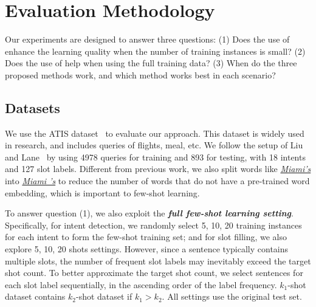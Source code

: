 \section{Evaluation Methodology}
Our experiments are designed to answer three questions: (1) Does the use of \REs enhance the learning quality when the number of training
instances is small? (2) Does the use of \REs help when using the full training data?
(3) When do the three proposed methods work, and which method works best in each scenario?

\subsection{Datasets}
\label{sec_datasest}

We use the ATIS dataset~\cite{hemphill1990atis} to evaluate our approach. This dataset is widely used in \SLU research, and
includes queries of flights, meal, etc. We follow the setup of Liu and Lane~ by using 4978 queries for training and 893 for
testing, with 18 intents and 127 slot labels.
Different from previous work, we also split words like
\textsl{\underline{Miami's}} into \textsl{\underline{Miami 's}} to reduce the number of words that do not have a pre-trained word
embedding, which is important to few-shot learning.

To answer question (1), we also exploit the \textbf{\emph{full few-shot learning setting}}. Specifically, for intent detection, we randomly
select 5, 10, 20 training instances for each intent to form the few-shot training set; and for slot filling, we also explore 5, 10, 20
shots settings. However, since a sentence typically contains multiple slots, the number of frequent slot labels may inevitably exceed
the target shot count. To better approximate the target shot count, we select sentences for each slot label sequentially, in the
ascending order of the label frequency.
$k_1$-shot dataset contains $k_2$-shot dataset if $k_1>k_2$.
All settings use the original test set.

